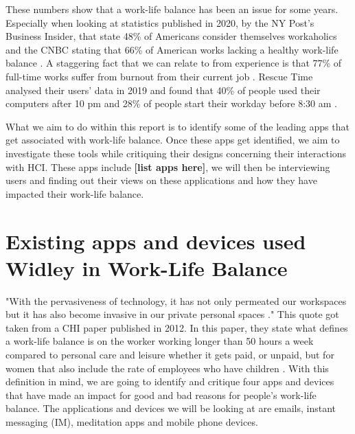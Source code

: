\documentclass{sigchi}
\begin{document}
	
	These numbers show that a work-life balance has been an issue for some years. Especially when looking at statistics published in 2020, by the NY Post's Business Insider, that state 48\% of Americans consider themselves workaholics and the CNBC stating that 66\% of American works lacking a healthy work-life balance \cite{work-life_2020}. A staggering fact that we can relate to from experience is that 77\% of full-time works suffer from burnout from their current job \cite{work-life_2020}. Rescue Time analysed their users' data in 2019 and found that 40\% of people used their computers after 10 pm and 28\% of people start their workday before 8:30 am \cite{rescuetime_study}.  
	
	What we aim to do within this report is to identify some of the leading apps that get associated with work-life balance. Once these apps get identified, we aim to investigate these tools while critiquing their designs concerning their interactions with HCI. These apps include \textbf{[list apps here]}, we will then be interviewing users and finding out their views on these applications and how they have impacted their work-life balance.
	
	  

\section{Existing apps and devices used Widley in Work-Life Balance}
	
	"With the pervasiveness of technology, it has not only permeated our workspaces but it has also become invasive in our private personal spaces \cite{peters2012sig}." This quote got taken from a CHI paper published in 2012. In this paper, they state what defines a work-life balance is on the worker working longer than 50 hours a week compared to personal care and leisure whether it gets paid, or unpaid, but for women that also include the rate of employees who have children \cite{peters2012sig}. With this definition in mind, we are going to identify and critique four apps and devices that have made an impact for good and bad reasons for people's work-life balance. The applications and devices we will be looking at are emails, instant messaging (IM), meditation apps and mobile phone devices.
	
\end{document}
